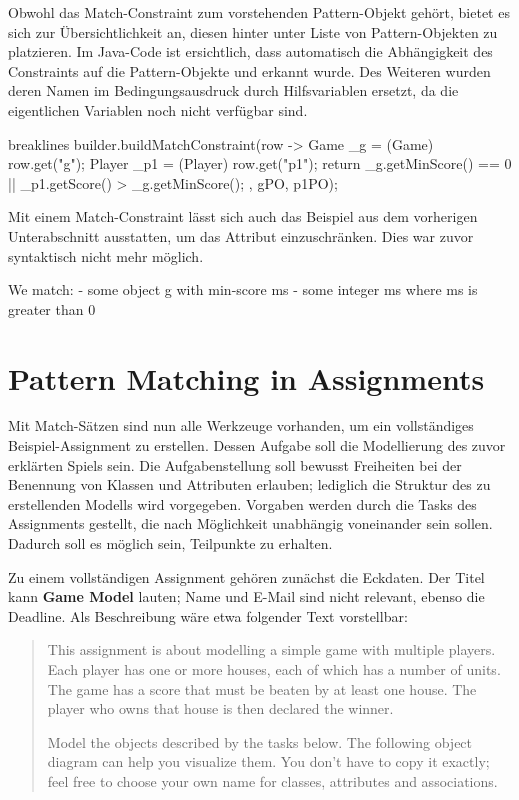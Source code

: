 Obwohl das Match-Constraint zum vorstehenden Pattern-Objekt gehört, bietet es sich zur Übersichtlichkeit an,
diesen hinter unter Liste von Pattern-Objekten zu platzieren.
Im Java-Code ist ersichtlich, dass automatisch die Abhängigkeit des Constraints auf die Pattern-Objekte  und  erkannt wurde.
Des Weiteren wurden deren Namen im Bedingungsausdruck durch Hilfsvariablen ersetzt, da die eigentlichen Variablen noch nicht verfügbar sind.

\begin{jcodeblock*}{breaklines}
    builder.buildMatchConstraint(row -> {
        Game _g = (Game) row.get("g");
        Player _p1 = (Player) row.get("p1");
        return _g.getMinScore() == 0 || _p1.getScore() > _g.getMinScore();
    }, gPO, p1PO);
\end{jcodeblock*}

Mit einem Match-Constraint lässt sich auch das Beispiel aus dem vorherigen Unterabschnitt ausstatten, um das Attribut  einzuschränken.
Dies war zuvor syntaktisch nicht mehr möglich.

\begin{mdcodeblock}
    We match:
    - some object g with min-score ms
    - some integer ms where ms is greater than 0
\end{mdcodeblock}

\section{Pattern Matching in Assignments}\label{sec:assignment-pattern-matching}

Mit Match-Sätzen sind nun alle Werkzeuge vorhanden, um ein vollständiges Beispiel-Assignment zu erstellen.
Dessen Aufgabe soll die Modellierung des zuvor erklärten Spiels sein.
Die Aufgabenstellung soll bewusst Freiheiten bei der Benennung von Klassen und Attributen erlauben;
lediglich die Struktur des zu erstellenden Modells wird vorgegeben.
Vorgaben werden durch die Tasks des Assignments gestellt, die nach Möglichkeit unabhängig voneinander sein sollen.
Dadurch soll es möglich sein, Teilpunkte zu erhalten.

Zu einem vollständigen Assignment gehören zunächst die Eckdaten.
Der Titel kann \textbf{Game Model} lauten;
Name und E-Mail sind nicht relevant, ebenso die Deadline.
Als Beschreibung wäre etwa folgender Text vorstellbar:

\begin{quote}
    This assignment is about modelling a simple game with multiple players.
    Each player has one or more houses, each of which has a number of units.
    The game has a score that must be beaten by at least one house.
    The player who owns that house is then declared the winner.

    Model the objects described by the tasks below.
    The following object diagram can help you visualize them.
    You don't have to copy it exactly;
    feel free to choose your own name for classes, attributes and associations.

\end{quote}

